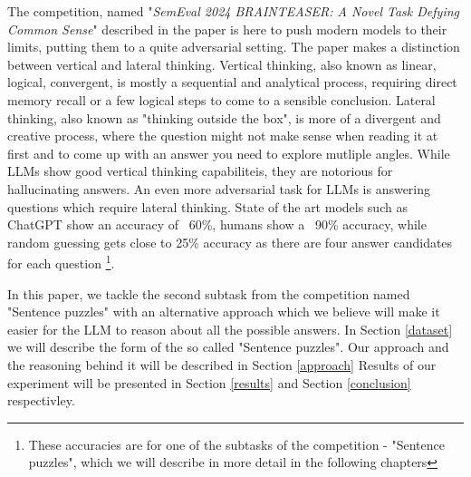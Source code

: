 The competition, named 
"\textit{SemEval 2024 BRAINTEASER: A Novel Task Defying Common Sense}" described in the paper 
\citep{semeval} is here to push modern models to their limits, putting
them to a quite adversarial setting.  The paper makes a distinction between vertical and lateral
thinking.  Vertical thinking, also known as linear, logical, convergent, is mostly a sequential and 
analytical process, requiring direct memory recall or a few logical steps to come to a sensible 
conclusion. Lateral thinking, also known as "thinking outside the box", is more of a divergent
and creative process, where the question might not make sense when reading it at first and to come
up with an answer you need to explore mutliple angles.  While LLMs show good vertical thinking 
capabiliteis, they are notorious for hallucinating answers. An even more adversarial task for
LLMs is answering questions which require lateral thinking.  State of the art models such as 
ChatGPT show an accuracy of ~60\%, humans show a ~90\% accuracy, while random 
guessing gets close to 25\% accuracy as there are four answer candidates for each question
\footnote[1]{These accuracies are
for one of the subtasks of the competition - "Sentence puzzles", which we will describe in more
detail in the following chapters}.

In this paper, we tackle the second subtask from the competition named "Sentence puzzles" with an
alternative approach which we believe will make it easier for the LLM to reason about all the
possible answers. In Section \ref{dataset} we will describe the form of the so called 
"Sentence puzzles".  Our approach and the reasoning behind it will be described in Section 
\ref{approach}  Results of our experiment will be presented in Section \ref{results} and 
Section \ref{conclusion} respectivley.


